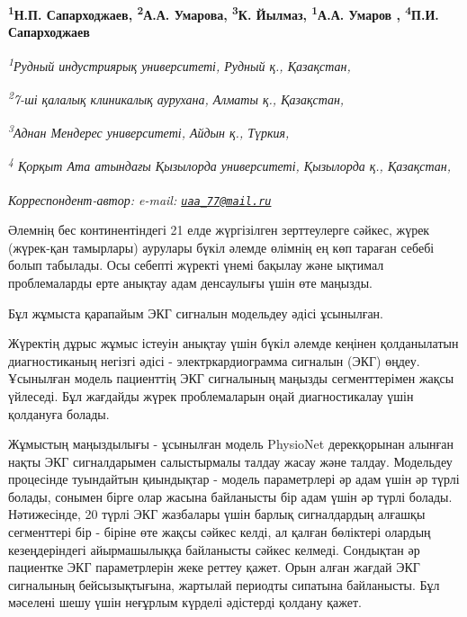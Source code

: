 
\begin{articleheader}

{\bfseries
\textsuperscript{1}Н.П. Сапарходжаев\authorid,
\textsuperscript{2}А.А. Умарова\authorid,
\textsuperscript{3}К. Йылмаз\authorid,
\textsuperscript{1}А.А. Умаров\textsuperscript{\envelope } \authorid,
\textsuperscript{4}П.И. Сапарходжаев\authorid}
\end{articleheader}

\begin{affiliation}
\emph{\textsuperscript{1}Рудный индустриярық университеті, Рудный қ., Қазақстан,}

\emph{\textsuperscript{2}7-ші қалалық клиникалық аурухана, Алматы қ., Қазақстан,}

\emph{\textsuperscript{3}Аднан Мендерес университеті, Айдын қ., Түркия,}

\emph{\textsuperscript{4} Қорқыт Ата атындағы Қызылорда университеті, Қызылорда қ., Қазақстан,}

\raggedright \textsuperscript{\envelope }{\em Корреспондент-автор: e-mail: \href{mailto:uaa_77@mail.ru}{\nolinkurl{uaa\_77@mail.ru}}}
\end{affiliation}

Әлемнің бес континентіндегі 21 елде жүргізілген зерттеулерге сәйкес,
жүрек (жүрек-қан тамырлары) аурулары бүкіл әлемде өлімнің ең көп тараған
себебі болып табылады. Осы себепті жүректі үнемі бақылау және ықтимал
проблемаларды ерте анықтау адам денсаулығы үшін өте маңызды.

Бұл жұмыста қарапайым ЭКГ сигналын модельдеу әдісі ұсынылған.

Жүректің дұрыс жұмыс істеуін анықтау үшін бүкіл әлемде кеңінен
қолданылатын диагностиканың негізгі әдісі - электркардиограмма сигналын
(ЭКГ) өңдеу. Ұсынылған модель пациенттің ЭКГ сигналының маңызды
сегменттерімен жақсы үйлеседі. Бұл жағдайды жүрек проблемаларын оңай
диагностикалау үшін қолдануға болады.

Жұмыстың маңыздылығы - ұсынылған модель PhysioNet дерекқорынан алынған
нақты ЭКГ сигналдарымен салыстырмалы талдау жасау және талдау. Модельдеу
процесінде туындайтын қиындықтар - модель параметрлері әр адам үшін әр
түрлі болады, сонымен бірге олар жасына байланысты бір адам үшін әр
түрлі болады. Нәтижесінде, 20 түрлі ЭКГ жазбалары үшін барлық
сигналдардың алғашқы сегменттері бір - біріне өте жақсы сәйкес келді, ал
қалған бөліктері олардың кезеңдеріндегі айырмашылыққа байланысты сәйкес
келмеді. Сондықтан әр пациентке ЭКГ параметрлерін жеке реттеу қажет.
Орын алған жағдай ЭКГ сигналының бейсызықтығына, жартылай периодты
сипатына байланысты. Бұл мәселені шешу үшін неғұрлым күрделі әдістерді
қолдану қажет.

